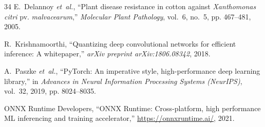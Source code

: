 \documentclass[journal,10pt,twocolumn]{IEEEtran}
\begin{document}
\begin{thebibliography}{34}
E.~Delannoy \emph{et~al.}, ``Plant disease resistance in cotton against \textit{Xanthomonas citri} pv. \textit{malvacearum},'' \emph{Molecular Plant Pathology}, vol.~6, no.~5, pp. 467--481, 2005.

R.~Krishnamoorthi, ``Quantizing deep convolutional networks for efficient inference: A whitepaper,'' \emph{arXiv preprint arXiv:1806.08342}, 2018.

A.~Paszke \emph{et~al.}, ``PyTorch: An imperative style, high-performance deep learning library,'' in \emph{Advances in Neural Information Processing Systems (NeurIPS)}, vol.~32, 2019, pp. 8024--8035.

{ONNX Runtime Developers}, ``ONNX Runtime: Cross-platform, high performance ML inferencing and training accelerator,'' \url{https://onnxruntime.ai/}, 2021.

\end{thebibliography}
\end{document}
